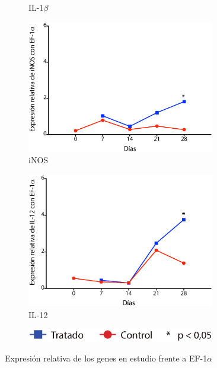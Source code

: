 \documentclass[12pt,letterpaper,oneside]{scrbook}
\begin{document}
\begin{figure}[h!]
\begin{subfigure}{0.5\textwidth}
        \caption{IL-1$\beta$}
        \label{fig:qpcr:il1b}
    \end{subfigure}
    \begin{subfigure}{0.5\textwidth}
        \includegraphics[width=0.9\textwidth]{eps/qPCR/qinos}
        \caption{iNOS}
        \label{fig:qpcr:inos}
    \end{subfigure}
    \begin{subfigure}{0.5\textwidth}
        \includegraphics[width=0.9\textwidth]{eps/qPCR/qil12}
        \caption{IL-12}
        \label{fig:qpcr:il12}
    \end{subfigure}
    \begin{subfigure}{0.5\textwidth}
        \includegraphics[width=0.9\textwidth]{eps/qPCR/leyenda}
    \end{subfigure}
    \caption{Expresión relativa de los genes en estudio frente a EF-1$\alpha$}
    \label{fig:qpcr}
\end{figure}
\end{document}
